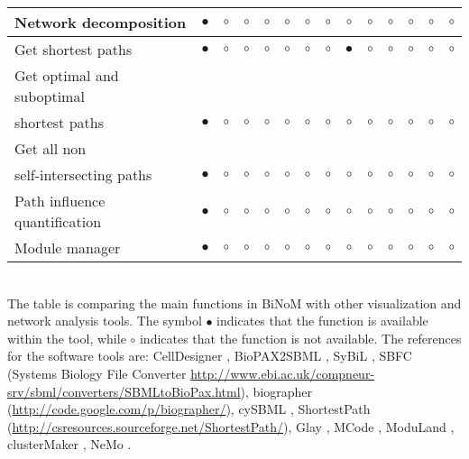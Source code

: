\documentclass[11pt]{bmc_article_s50}
\newenvironment{bmcformat}{\begin{raggedright}\baselineskip20pt\sloppy\setboolean{publ}{false}}{\end{raggedright}\baselineskip20pt\sloppy}
\begin{document}
\begin{bmcformat}
\begin{sidewaystable}
\begin{tabular}{lccccccccccccc}
        Network decomposition & $\bullet$      &$\circ$&$\circ$& $\circ$      & $\circ$       & $\circ$           & $\circ$     & $\circ$               &  $\circ$      &  $\circ$       &  $\circ$           & $\circ$            &  $\circ$      \\ \hline
        Get shortest paths    & $\bullet$      &$\circ$&$\circ$& $\circ$      & $\circ$       & $\circ$           & $\circ$     & $\bullet$               &  $\circ$      &  $\circ$       &  $\circ$           & $\circ$            &  $\circ$      \\ \hline
        Get optimal and suboptimal & & & & & & & & & & & & &
          \\shortest paths    & $\bullet$      &$\circ$&$\circ$& $\circ$      & $\circ$       & $\circ$           & $\circ$     & $\circ$               &  $\circ$      &  $\circ$       &  $\circ$           & $\circ$            &  $\circ$      \\ \hline
        Get all non & & & & & & & & & & & & &
          \\self-intersecting paths    & $\bullet$      &$\circ$&$\circ$& $\circ$      & $\circ$       & $\circ$           & $\circ$     & $\circ$               &  $\circ$      &  $\circ$       &  $\circ$           & $\circ$            &  $\circ$      \\ \hline
        Path influence quantification & $\bullet$      &$\circ$&$\circ$& $\circ$      & $\circ$       & $\circ$           & $\circ$     & $\circ$               &  $\circ$      &  $\circ$       &  $\circ$           & $\circ$            &  $\circ$      \\ \hline
        Module manager       & $\bullet$      &$\circ$&$\circ$& $\circ$      & $\circ$       & $\circ$           & $\circ$     & $\circ$               &  $\circ$      &  $\circ$       &  $\circ$           & $\circ$            &  $\circ$      \\
        \hline
      \end{tabular}\\
 The table is comparing the main functions in BiNoM with other visualization
 and network analysis tools. The symbol $\bullet$ indicates that the function is
 available within the tool, while $\circ$ indicates that the function is not
 available. The references for the software tools are: CellDesigner
 \cite{funahashi2003celldesigner, mi2011biopax}, BioPAX2SBML
 \cite{buchel2012qualitative}, SyBiL  \cite{ruebenacker2009integrating}, SBFC
 (Systems Biology File Converter
 \url{http://www.ebi.ac.uk/compneur-srv/sbml/converters/SBMLtoBioPax.html}),
 biographer (\url{http://code.google.com/p/biographer/}), cySBML
 \cite{konig2012cysbml}, ShortestPath
 (\url{http://csresources.sourceforge.net/ShortestPath/}), Glay
 \cite{su2010glay}, MCode \cite{bader2003automated}, ModuLand
 \cite{szalay2012moduland}, clusterMaker \cite{morris2011clustermaker}, NeMo
 \cite{rivera2010nemo}.


\end{sidewaystable}
\end{bmcformat}
\end{document}
